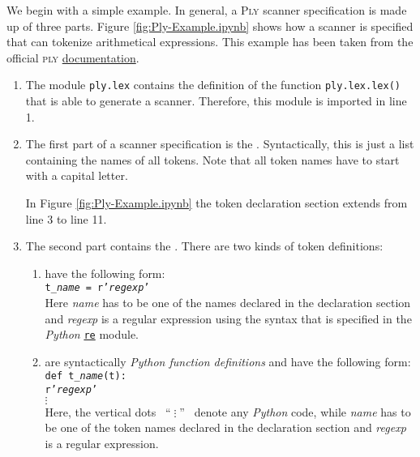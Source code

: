 We begin with a simple example.  In general, a \textsc{Ply} scanner specification is made up of three parts.
Figure \ref{fig:Ply-Example.ipynb} shows how a scanner is specified that can tokenize arithmetical expressions.
This example has been taken from the official \textsc{ply}
\href{https://ply.readthedocs.io/en/latest/ply.html#specification-of-tokens}{documentation}. 
\begin{enumerate}
\item The module \texttt{ply.lex} contains the definition of the function \texttt{ply.lex.lex()}
      that is able to generate a scanner.
      Therefore, this module is imported in line 1.
\item The first part of a scanner specification is the .
      Syntactically, this is just a list containing the names of all tokens.  Note that all token names have to
      start with a capital 
      letter.

      In Figure \ref{fig:Ply-Example.ipynb} the token declaration section extends from line 3 to line 11.
\item The second part contains the .  There are two kinds of token definitions:
      \begin{enumerate}
      \item {}  have the following form:
            \\[0.2cm]
            \hspace*{1.3cm}
            \texttt{t\_\textsl{name} = r'\textsl{regexp}'}
            \\[0.2cm]
            Here \textsl{name} has to be one of the names declared in the declaration section and
            \textsl{regexp} is a regular expression using the syntax that is specified in the 
            \textsl{Python} \href{https://docs.python.org/3/library/re.html}{\texttt{re}} module.
      \item {}  are syntactically
            \textsl{Python function definitions} and have the following form:
            \\[0.2cm]
            \hspace*{1.3cm}
            \texttt{def t\_\textsl{name}(t):} \\
            \hspace*{2.05cm}
            \texttt{r'\textsl{regexp}'} \\
            \hspace*{2.8cm} $\vdots$ \\[0.2cm]
            Here, the vertical dots \ ``$\;\vdots\;$'' \ denote any \textsl{Python} code, while
            \textsl{name} has to be one of the token names declared in the declaration section and
            \textsl{regexp} is a regular expression.
            

\end{enumerate}
\end{enumerate}
